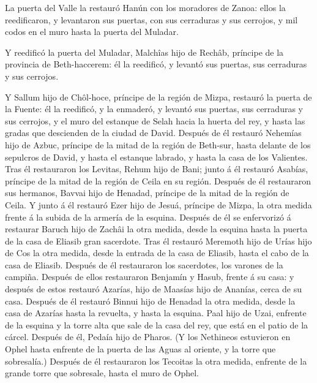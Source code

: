  La puerta del Valle la restauró Hanún con los moradores de
Zanoa: ellos la reedificaron, y levantaron sus puertas, con sus
cerraduras y sus cerrojos, y mil codos en el muro hasta la puerta del
Muladar.

 Y reedificó la puerta del Muladar, Malchîas hijo de
Rechâb, príncipe de la provincia de Beth-haccerem: él la reedificó, y
levantó sus puertas, sus cerraduras y sus cerrojos.

 Y Sallum hijo de Chôl-hoce, príncipe de la región de
Mizpa, restauró la puerta de la Fuente: él la reedificó, y la enmaderó,
y levantó sus puertas, sus cerraduras y sus cerrojos, y el muro del
estanque de Selah hacia la huerta del rey, y hasta las gradas que
descienden de la ciudad de David.  Después de él restauró
Nehemías hijo de Azbuc, príncipe de la mitad de la región de Beth-sur,
hasta delante de los sepulcros de David, y hasta el estanque labrado, y
hasta la casa de los Valientes.  Tras él restauraron los
Levitas, Rehum hijo de Bani; junto á él restauró Asabías, príncipe de la
mitad de la región de Ceila en su región.  Después de él
restauraron sus hermanos, Bavvai hijo de Henadad, príncipe de la mitad
de la región de Ceila.  Y junto á él restauró Ezer hijo de
Jesuá, príncipe de Mizpa, la otra medida frente á la subida de la
armería de la esquina.  Después de él se enfervorizó á
restaurar Baruch hijo de Zachâi la otra medida, desde la esquina hasta
la puerta de la casa de Eliasib gran sacerdote.  Tras él
restauró Meremoth hijo de Urías hijo de Cos la otra medida, desde la
entrada de la casa de Eliasib, hasta el cabo de la casa de Eliasib.
 Después de él restauraron los sacerdotes, los varones de
la campiña.  Después de ellos restauraron Benjamín y Hasub,
frente á su casa: y después de estos restauró Azarías, hijo de Maasías
hijo de Ananías, cerca de su casa.  Después de él restauró
Binnui hijo de Henadad la otra medida, desde la casa de Azarías hasta la
revuelta, y hasta la esquina.  Paal hijo de Uzai, enfrente
de la esquina y la torre alta que sale de la casa del rey, que está en
el patio de la cárcel. Después de él, Pedaía hijo de Pharos.
 (Y los Nethineos estuvieron en Ophel hasta enfrente de la
puerta de las Aguas al oriente, y la torre que sobresalía.)
 Después de él restauraron los Tecoitas la otra medida,
enfrente de la grande torre que sobresale, hasta el muro de Ophel.

